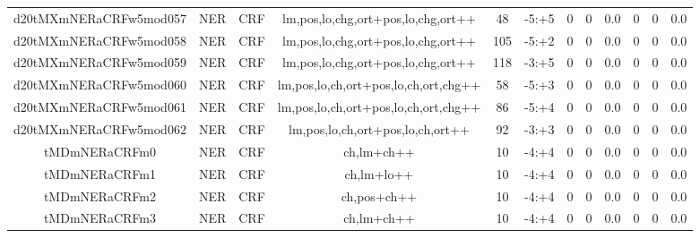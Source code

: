 \documentclass[a4paper]{article}
\begin{document}
\begin{landscape}
\begin{center}
\begin{tabular}{ |c|c|c|c|c|c|c|c|c|c|c|c|}
 
 	
 	\small{ d20tMXmNERaCRFw5mod057 } & \small{ NER} & \small{  CRF }  & lm,pos,lo,chg,ort+pos,lo,chg,ort++  &  48 &  \small{  -5:+5 }  &  0 & 0 & 0.0  &  0 & 0 & 0.0 \\
 	

 
 	
 	\small{ d20tMXmNERaCRFw5mod058 } & \small{ NER} & \small{  CRF }  & lm,pos,lo,chg,ort+pos,lo,chg,ort++  &  105 &  \small{  -5:+2 }  &  0 & 0 & 0.0  &  0 & 0 & 0.0 \\
 	

 
 	
 	\small{ d20tMXmNERaCRFw5mod059 } & \small{ NER} & \small{  CRF }  & lm,pos,lo,chg,ort+pos,lo,chg,ort++  &  118 &  \small{  -3:+5 }  &  0 & 0 & 0.0  &  0 & 0 & 0.0 \\
 	

 
 	
 	\small{ d20tMXmNERaCRFw5mod060 } & \small{ NER} & \small{  CRF }  & lm,pos,lo,ch,ort+pos,lo,ch,ort,chg++  &  58 &  \small{  -5:+3 }  &  0 & 0 & 0.0  &  0 & 0 & 0.0 \\
 	

 
 	
 	\small{ d20tMXmNERaCRFw5mod061 } & \small{ NER} & \small{  CRF }  & lm,pos,lo,ch,ort+pos,lo,ch,ort,chg++  &  86 &  \small{  -5:+4 }  &  0 & 0 & 0.0  &  0 & 0 & 0.0 \\
 	

 
 	
 	\small{ d20tMXmNERaCRFw5mod062 } & \small{ NER} & \small{  CRF }  & lm,pos,lo,ch,ort+pos,lo,ch,ort++  &  92 &  \small{  -3:+3 }  &  0 & 0 & 0.0  &  0 & 0 & 0.0 \\
 	

 
 	
 	\small{ tMDmNERaCRFm0 } & \small{ NER} & \small{  CRF }  & ch,lm+ch++  &  10 &  \small{  -4:+4 }  &  0 & 0 & 0.0  &  0 & 0 & 0.0 \\
 	

 
 	
 	\small{ tMDmNERaCRFm1 } & \small{ NER} & \small{  CRF }  & ch,lm+lo++  &  10 &  \small{  -4:+4 }  &  0 & 0 & 0.0  &  0 & 0 & 0.0 \\
 	

 
 	
 	\small{ tMDmNERaCRFm2 } & \small{ NER} & \small{  CRF }  & ch,pos+ch++  &  10 &  \small{  -4:+4 }  &  0 & 0 & 0.0  &  0 & 0 & 0.0 \\
 	

 
 	
 	\small{ tMDmNERaCRFm3 } & \small{ NER} & \small{  CRF }  & ch,lm+ch++  &  10 &  \small{  -4:+4 }  &  0 & 0 & 0.0  &  0 & 0 & 0.0 \\
 	

\end{tabular}
\end{center}
\end{landscape}
\end{document}
